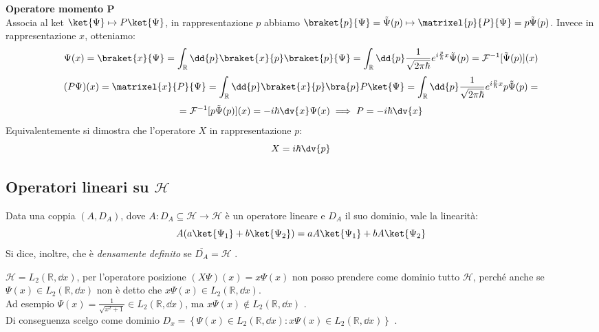 

\begin{example}
    \textbf{Operatore momento P}\\
    Associa al ket \(\ket{\Psi}\mapsto P\ket{\Psi}\), in rappresentazione \(p\) 
    abbiamo \(\braket{p}{\Psi}= \tilde{\Psi}(p)\mapsto \matrixel{p}{P}{\Psi}= p\tilde{\Psi}(p)\).
    Invece in rappresentazione \(x \), otteniamo:
    \[
        \Psi(x) = \braket{x}{\Psi} = \int_\mathbb{R} \dd{p} \braket{x}{p} \braket{p}{\Psi}= 
        \int_\mathbb{R} \dd{p} \frac{1}{\sqrt{2\pi \hbar}} e^{i\frac{p}{\hbar}x} \tilde{\Psi}(p)= 
        \mathcal{F}^{-1}[\tilde{\Psi}(p)](x)
    \]
    \[
        (P\Psi)(x)= \matrixel{x}{P}{\Psi}=\int_\mathbb{R} \dd{p} \braket{x}{p} \bra{p}P\ket{\Psi}= 
        \int_\mathbb{R} \dd{p} \frac{1}{\sqrt{2\pi \hbar}} e^{i\frac{p}{\hbar}x}p \tilde{\Psi}(p)= 
    \]
    \begin{equation}
        =\mathcal{F}^{-1}[p\tilde{\Psi}(p)](x)= -i\hbar \dv{x} \Psi(x) \implies P = -i\hbar \dv{x}
    \end{equation}
    Equivalentemente si dimostra che l'operatore \(X\) in rappresentazione \(p\): 
    \begin{equation}
        X = i\hbar \dv{p}
    \end{equation}
\end{example}


\subsection[Operatori lineari]{Operatori lineari su \(\mathcal{H}\)}

Data una coppia \((A, D_A)\), dove \(A: D_A \subseteq \mathcal{H}\to \mathcal{H}\) è un operatore lineare e \(D_A\) il suo dominio, 
vale la linearità:
\[
A(a\ket{\Psi_1}+ b\ket{\Psi_2})= aA\ket{\Psi_1}+bA\ket{\Psi_2}
\]
Si dice, inoltre, che è \textit{densamente definito} se \(\overline{D_A}= \mathcal{H}\) .

\begin{example}
    \(\mathcal{H}= L_2(\mathbb{R},\dd{x})\), per l'operatore posizione \((X\Psi)(x)= x\Psi(x)\) 
    non posso prendere come dominio tutto \(\mathcal{H}\), perché anche se \(\Psi(x) \in L_2(\mathbb{R},\dd{x})\) 
    non è detto che \(x\Psi(x) \in L_2(\mathbb{R}, \dd{x})\). \\
    Ad esempio \(\Psi(x)= \frac{1}{\sqrt{x^2+1}} \in L_2(\mathbb{R},\dd{x})\), ma \(x\Psi(x) \notin  L_2(\mathbb{R}, \dd{x})\) .\\
    Di conseguenza scelgo come dominio \(D_x=  \left\{\Psi(x) \in L_2(\mathbb{R}, \dd{x}) : x \Psi(x) \in L_2(\mathbb{R}, \dd{x})  \right\}\) .
\end{example}

